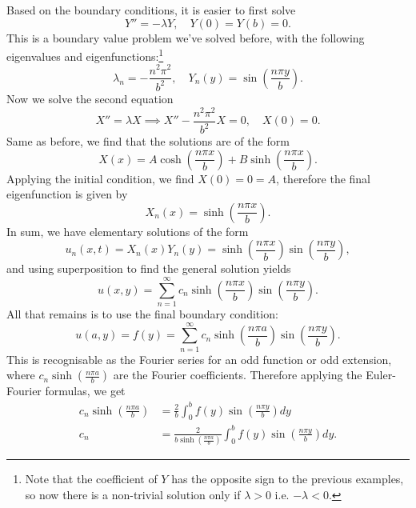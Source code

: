 \begin{enumerate}
	Based on the boundary conditions, it is easier to first solve
	\[
	Y'' = -\lambda Y, \quad Y(0) = Y(b) = 0.
	\]
	This is a boundary value problem we've solved before, with the following eigenvalues and eigenfunctions:\footnote{Note that the coefficient of $Y$ has the opposite sign to the previous examples, so now there is a non-trivial solution only if $\lambda>0$ i.e. $-\lambda<0$.}
	\[
	\lambda_n = -\frac{n^2\pi^2}{b^2}, \quad Y_n(y) = \sin\left(\frac{n\pi y}{b}\right).
	\]
	Now we solve the second equation
	\[
	X'' = \lambda X \implies X'' - \frac{n^2\pi^2}{b^2}X = 0, \quad X(0)=0.
	\]
	Same as before, we find that the solutions are of the form
	\[
	X(x) = A\cosh\left(\frac{n\pi x}{b}\right) + B\sinh\left(\frac{n\pi x}{b}\right).
	\]
	Applying the initial condition, we find $X(0) = 0 = A$, therefore the final eigenfunction is given by
	\[
	X_n(x) = \sinh\left(\frac{n\pi x}{b}\right).
	\]
	In sum, we have elementary solutions of the form
	\[
	u_n(x,t) = X_n(x) Y_n(y) = \sinh\left(\frac{n\pi x}{b}\right) \sin\left(\frac{n\pi y}{b}\right),
	\]
	and using superposition to find the general solution yields
	\begin{equation}
		u(x,y) = \sum_{n=1}^{\infty} c_n \sinh\left(\frac{n\pi x}{b}\right) \sin\left(\frac{n\pi y}{b}\right).
	\end{equation}
	All that remains is to use the final boundary condition:
	\[
	u(a,y) = f(y) = \sum_{n=1}^{\infty} c_n \sinh\left(\frac{n\pi a}{b}\right) \sin\left(\frac{n\pi y}{b}\right).
	\]
	This is recognisable as the Fourier series for an odd function or odd extension, where $c_n \sinh\left(\frac{n\pi a}{b}\right)$ are the Fourier coefficients. Therefore applying the Euler-Fourier formulas, we get
	\begin{align}
		c_n \sinh\left(\frac{n\pi a}{b}\right) &= \frac{2}{b} \int_0^b f(y)\sin\left(\frac{n\pi y}{b}\right)dy \nonumber \\
		c_n &= \frac{2}{b\sinh\left(\frac{n\pi a}{b}\right)} \int_0^b f(y)\sin\left(\frac{n\pi y}{b}\right)dy.
	\end{align}
	

\end{enumerate}
